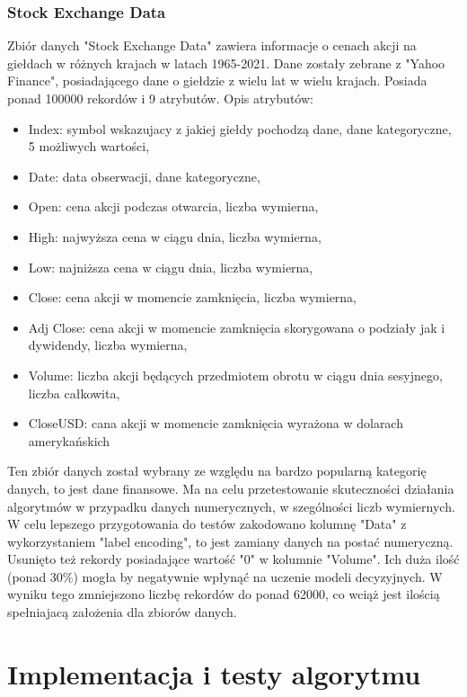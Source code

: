 \documentclass[12pt,twoside]{article}
\begin{document}
\subsubsection{Stock Exchange Data}
Zbiór danych "Stock Exchange Data" zawiera informacje o cenach akcji na giełdach w różnych krajach w latach 1965-2021.
Dane zostały zebrane z "Yahoo Finance", posiadającego dane o giełdzie z wielu lat w wielu krajach. Posiada ponad 100000 rekordów i 9 atrybutów. \cite{stock} Opis atrybutów:
\begin{itemize}[label=-,labelsep=0.4cm, leftmargin=1.25cm]
    \item Index: symbol wskazujacy z jakiej giełdy pochodzą dane, dane kategoryczne, 5 możliwych wartości,
    \item Date: data obserwacji, dane kategoryczne,
    \item Open: cena akcji podczas otwarcia, liczba wymierna,
    \item High: najwyższa cena w ciągu dnia, liczba wymierna,
    \item Low: najniższa cena w ciągu dnia, liczba wymierna,
    \item Close: cena akcji w momencie zamknięcia, liczba wymierna,
    \item Adj Close: cena akcji w momencie zamknięcia skorygowana o podziały jak i dywidendy, liczba wymierna,
    \item Volume: liczba akcji będących przedmiotem obrotu w ciągu dnia sesyjnego, liczba całkowita,
    \item CloseUSD: cana akcji w momencie zamknięcia wyrażona w dolarach amerykańskich
\end{itemize}
Ten zbiór danych został wybrany ze względu na bardzo popularną kategorię danych, to jest dane finansowe.
Ma na celu przetestowanie skuteczności działania algorytmów w przypadku danych numerycznych, w szególności liczb wymiernych.
W celu lepszego przygotowania do testów zakodowano kolumnę "Data" z wykorzystaniem "label encoding", to jest zamiany danych na postać numeryczną.
Usunięto też rekordy posiadające wartość "0" w kolumnie "Volume". Ich duża ilość (ponad 30\%) mogła by negatywnie wpłynąć na uczenie modeli decyzyjnych.
W wyniku tego zmniejszono liczbę rekordów do ponad 62000, co wciąż jest ilością spełniajacą założenia dla zbiorów danych.
\clearpage


\section{Implementacja i testy algorytmu}
\end{document}
